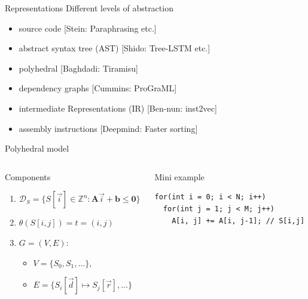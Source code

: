 \documentclass[presentation, aspectratio=169]{beamer}
\begin{document}
\begin{frame}[label={sec:orgdee6bbb}]{Representations}
Different levels of abstraction
\begin{itemize}
\item source code [Stein: Paraphrasing etc.]
\item abstract syntax tree (AST) [Shido: Tree-LSTM etc.]
\item polyhedral [Baghdadi: Tiramisu]
\item dependency graphs [Cummins: ProGraML]
\item intermediate Representations (IR) [Ben-nun: inst2vec]
\item assembly instructions [Deepmind: Faster sorting]
\end{itemize}
\end{frame}
\begin{frame}[label={sec:orgc5d72af},fragile]{Polyhedral model}
 \begin{columns}
\begin{column}{0.45\columnwidth}
\begin{block}{Components}
\begin{enumerate}
\item \(\mathcal{D}_S = \{ S[\vec{i}] \in \mathbb{Z}^n : \mathbf{A} \vec{i} + \mathbf{b} \le \mathbf{0}  \}\)
\item \(\theta(S[i, j]) = t = (i, j)\)
\item \(G=(V, E)\):
\begin{itemize}
\item \(V=\{ S_0, S_1, \ldots\}\),
\item \(E=\{ S_i[\vec{d}] \mapsto S_j[\vec{r}], \ldots \}\)
\end{itemize}
\end{enumerate}
\end{block}
\end{column}
\begin{column}{0.45\columnwidth}
\begin{block}{Mini example}
\begin{verbatim}
for(int i = 0; i < N; i++)
  for(int j = 1; j < M; j++)
    A[i, j] += A[i, j-1]; // S[i,j]
\end{verbatim}
\end{block}
\end{column}
\end{columns}
\end{frame}
\end{document}
